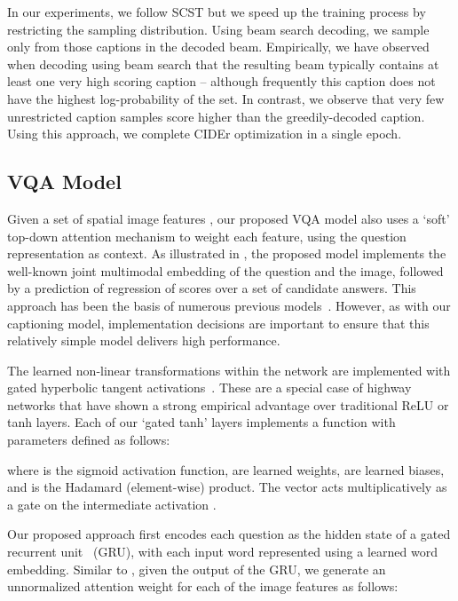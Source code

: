 \documentclass[10pt,twocolumn,letterpaper]{article}
\begin{document}
In our experiments, we follow SCST but we speed up the training process by restricting the sampling distribution. Using beam search decoding, we sample only from those captions in the decoded beam. Empirically, we have observed when decoding using beam search that the resulting beam typically contains at least one very high scoring caption -- although frequently this caption does not have the highest log-probability of the set. In contrast, we observe that very few unrestricted caption samples score higher than the greedily-decoded caption. Using this approach, we complete CIDEr optimization in a single epoch.

\subsection{VQA Model}
\label{sec:vqa}

Given a set of spatial image features , our proposed VQA model also uses a `soft' top-down attention mechanism to weight each feature, using the question representation as context. As illustrated in , the proposed model implements the well-known joint multimodal embedding of the question and the image, followed by a prediction of regression of scores over a set of candidate answers. This approach has been the basis of numerous previous models~\cite{jabri2016revisiting,kazemi2017baseline,teney2016zsvqa}. However, as with our captioning model, implementation decisions are important to ensure that this relatively simple model delivers high performance.

The learned non-linear transformations within the network are implemented with gated hyperbolic tangent activations~\cite{dauphin2016languagecnn}. These are a special case of highway networks \cite{srivastava2015highway} that have shown a strong empirical advantage over traditional ReLU or tanh layers. Each of our `gated tanh' layers implements a function  with parameters  defined as follows:

\noindent
where  is the sigmoid activation function,  are learned weights,  are learned biases, and  is the Hadamard (element-wise) product. The vector  acts multiplicatively as a gate on the intermediate activation .

Our proposed approach first encodes each question as the hidden state  of a gated recurrent unit~\cite{cho2014learning} (GRU), with each input word represented using a learned word embedding. Similar to , given the output  of the GRU, we generate an unnormalized attention weight  for each of the  image features  as follows:
\end{document}
